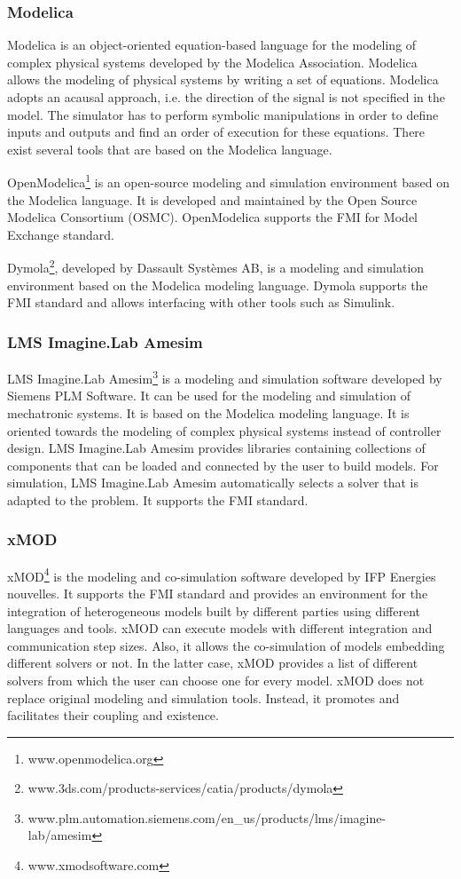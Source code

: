 \subsubsection{Modelica}
Modelica \cite{modelica:2017} is an object-oriented equation-based language for the modeling of complex physical systems developed by the Modelica Association. Modelica allows the modeling of physical systems by writing a set of equations. Modelica adopts an acausal approach, i.e. the direction of the signal is not specified in the model. The simulator has to perform symbolic manipulations in order to define inputs and outputs and find an order of execution for these equations. There exist several tools that are based on the Modelica language.

OpenModelica\footnote{www.openmodelica.org} is an open-source modeling and simulation environment based on the Modelica language. It is developed and maintained by the Open Source Modelica Consortium (OSMC). OpenModelica supports the FMI for Model Exchange standard.

Dymola\footnote{www.3ds.com/products-services/catia/products/dymola}, developed by Dassault Syst\`emes AB, is a modeling and simulation environment based on the Modelica modeling language. Dymola supports the FMI standard and allows interfacing with other tools such as Simulink.

\subsubsection{LMS Imagine.Lab Amesim}
LMS Imagine.Lab Amesim\footnote{www.plm.automation.siemens.com/en\_us/products/lms/imagine-lab/amesim} is a modeling and simulation software developed by Siemens PLM Software. It can be used for the modeling and simulation of mechatronic systems. It is based on the Modelica modeling language. It is oriented towards the modeling of complex physical systems instead of controller design. LMS Imagine.Lab Amesim provides libraries containing collections of components that can be loaded and connected by the user to build models. For simulation, LMS Imagine.Lab Amesim automatically selects a solver that is adapted to the problem. It supports the FMI standard.

\subsubsection{xMOD}
xMOD\footnote{www.xmodsoftware.com} is the modeling and co-simulation software developed by IFP Energies nouvelles. It supports the FMI standard and provides an environment for the integration of heterogeneous models built by different parties using different languages and tools. xMOD can execute models with different integration and communication step sizes. Also, it allows the co-simulation of models embedding different solvers or not. In the latter case, xMOD provides a list of different solvers from which the user can choose one for every model. xMOD does not replace original modeling and simulation tools. Instead, it promotes and facilitates their coupling and existence.

